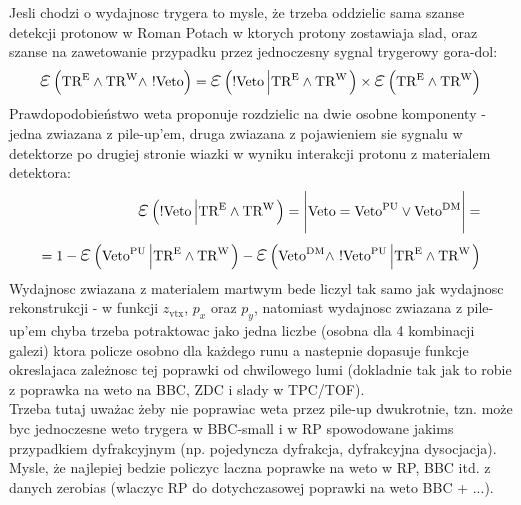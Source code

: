 Jesli chodzi o wydajnosc trygera to mysle, że trzeba oddzielic sama szanse detekcji protonow w Roman Potach w ktorych protony zostawiaja slad, oraz szanse na zawetowanie przypadku przez jednoczesny sygnal trygerowy gora-dol:
\begin{equation}
\mbox{\LARGE$\varepsilon$}\left(\TRE\land\TRW\land~!\V\right) = \mbox{\LARGE$\varepsilon$}\left(!\V\left|\TRE\land\TRW\right.\right)\times\mbox{\LARGE$\varepsilon$}\left(\TRE\land\TRW\right)
\end{equation}
Prawdopodobieństwo weta proponuje rozdzielic na dwie osobne komponenty - jedna zwiazana z pile-up'em, druga zwiazana z pojawieniem sie sygnalu w detektorze po drugiej stronie wiazki w wyniku interakcji protonu z materialem detektora:
\begin{equation}
\begin{split}
\mbox{\LARGE$\varepsilon$}\left(!\V\left|\TRE\land\TRW\right.\right)=\Bigg|\V=\Vpu\vee\Vdm\Bigg|=\\=1-\mbox{\LARGE$\varepsilon$}\left(\Vpu\left|\TRE\land\TRW\right.\right)-\mbox{\LARGE$\varepsilon$}\left(\Vdm\land~!\Vpu\left|\TRE\land\TRW\right.\right)
\end{split}
\end{equation}
Wydajnosc zwiazana z materialem martwym bede liczyl tak samo jak wydajnosc rekonstrukcji - w funkcji $z_{\text{vtx}}$, $p_{x}$ oraz $p_{y}$, natomiast wydajnosc zwiazana z pile-up'em chyba trzeba potraktowac jako jedna liczbe (osobna dla 4 kombinacji galezi) ktora policze osobno dla każdego runu a nastepnie dopasuje funkcje okreslajaca zależnosc tej poprawki od chwilowego lumi (dokladnie tak jak to robie z poprawka na weto na BBC, ZDC i slady w TPC/TOF).\\
Trzeba tutaj uważac żeby nie poprawiac weta przez pile-up dwukrotnie, tzn. może byc jednoczesne weto trygera w BBC-small i w RP spowodowane jakims przypadkiem dyfrakcyjnym (np. pojedyncza dyfrakcja, dyfrakcyjna dysocjacja). Mysle, że najlepiej bedzie policzyc laczna poprawke na weto w RP, BBC itd. z danych zerobias (wlaczyc RP do dotychczasowej poprawki na weto BBC + ...).\\
